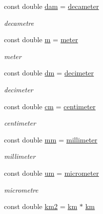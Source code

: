 \begin{DoxyCompactItemize}
const double \hyperlink{namespace_utilities_ad242ea541744880484ba811bc49fb881}{dam} = \hyperlink{namespace_utilities_a66e92dbad293594bf063d31aa9305983}{decameter}
\begin{DoxyCompactList}\small\item\em decametre \end{DoxyCompactList}\item 
const double \hyperlink{namespace_utilities_a205e9c8c24630292f2d0213f433503e9}{m} = \hyperlink{namespace_utilities_a2b626049c35729f994e12d5f4f950d6b}{meter}
\begin{DoxyCompactList}\small\item\em meter \end{DoxyCompactList}\item 
const double \hyperlink{namespace_utilities_a811d072b0676c0e47666a99c20fb5eee}{dm} = \hyperlink{namespace_utilities_a66145380051759756714059815f45e18}{decimeter}
\begin{DoxyCompactList}\small\item\em decimeter \end{DoxyCompactList}\item 
const double \hyperlink{namespace_utilities_a43701408f4de13788368dce37066801f}{cm} = \hyperlink{namespace_utilities_a17483d8b3688f5a3786b48f4ed70588c}{centimeter}
\begin{DoxyCompactList}\small\item\em centimeter \end{DoxyCompactList}\item 
const double \hyperlink{namespace_utilities_ada68d4ec8f02c2ffc43db9220cbdcba8}{mm} = \hyperlink{namespace_utilities_ae8c7101098fba61f862817a083c422ca}{millimeter}
\begin{DoxyCompactList}\small\item\em millimeter \end{DoxyCompactList}\item 
const double \hyperlink{namespace_utilities_a79bb1876d9d2416239e3ca0b57582018}{um} = \hyperlink{namespace_utilities_a99dfe40c94af0523293210aaf01a0435}{micrometer}
\begin{DoxyCompactList}\small\item\em micrometre \end{DoxyCompactList}\item 
const double \hyperlink{namespace_utilities_a61a790dbfa282940ea38347f86885324}{km2} = \hyperlink{namespace_utilities_a4e01876aaa4c4d98bcbf9526e980d996}{km} $\ast$ \hyperlink{namespace_utilities_a4e01876aaa4c4d98bcbf9526e980d996}{km}

\end{DoxyCompactItemize}
